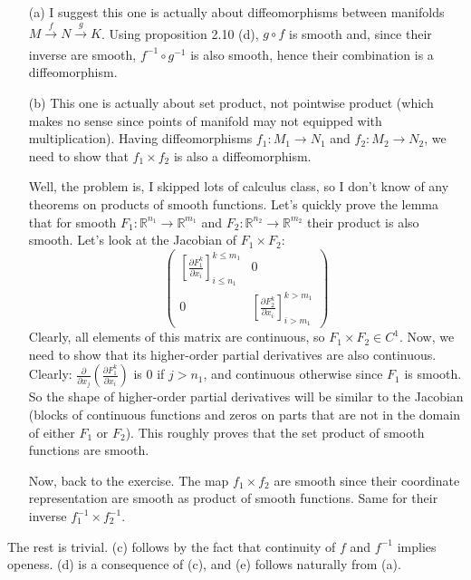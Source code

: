 \documentclass[a4paper]{article}
\begin{document}
\begin{note}[on ex. 2.16]
\begin{enumerate}
    \item[(a)] I suggest this one is actually about diffeomorphisms between manifolds
        $M \xrightarrow[]{f} N \xrightarrow[]{g} K$. Using proposition 2.10 (d),
        $g\circ f$ is smooth and, since their inverse are smooth,
        $f^{-1}\circ g^{-1}$ is also smooth, hence their combination
        is a diffeomorphism.
    \item[(b)] This one is actually about set product, not pointwise product
        (which makes no sense since points of manifold may not equipped with multiplication).
        Having diffeomorphisms $f_1\colon M_1 \to N_1$ and $f_2\colon M_2 \to N_2$,
        we need to show that $f_1 \times f_2$ is also a diffeomorphism.

        Well, the problem is, I skipped lots of calculus class, so I don't know
        of any theorems on products of smooth functions. Let's quickly
        prove the lemma that for smooth $F_1\colon \mathbb{R}^{n_1} \to \mathbb{R}^{m_1}$ and
        $F_2\colon \mathbb{R}^{n_2} \to \mathbb{R}^{m_2} $ their product is also
        smooth. Let's look at the Jacobian of $F_1 \times F_2$:
        $$
        \begin{pmatrix}
            \left[ \frac{\partial F_1^k}{\partial x_i} \right]_{i \le n_1}^{k \le m_1} & 0 \\
            0 & \left[ \frac{\partial F_2^k}{\partial x_i} \right]_{i>m_1}^{k>m_1}  
        \end{pmatrix} 
        $$
        Clearly, all elements of this matrix are continuous, so $F_1\times F_2 \in C^1 $.
        Now, we need to show that its higher-order partial derivatives are also continuous.
        Clearly:
        $\frac{\partial }{\partial x_j} \left( \frac{\partial F_1^k}{\partial x_i} \right)  $
        is $0$ if $j > n_1$, and continuous otherwise since $F_1$ is smooth. So the shape of higher-order
        partial derivatives will be similar to the Jacobian (blocks of continuous
        functions and zeros on parts that are not in the domain of either $F_1$ or $F_2$).
        This roughly proves that the set product of smooth functions are smooth.

        Now, back to the exercise. The map $f_1\times f_2$ are smooth since their coordinate
        representation are smooth as product of smooth functions. Same for their inverse
        $f_1^{-1} \times f_2^{-1}$.

    \end{enumerate}
    The rest is trivial. (c) follows by the fact that continuity of $f$
    and $f^{-1}$ implies openess. (d) is a consequence of (c), and (e) follows
    naturally from (a).
\end{note}
\end{document}
